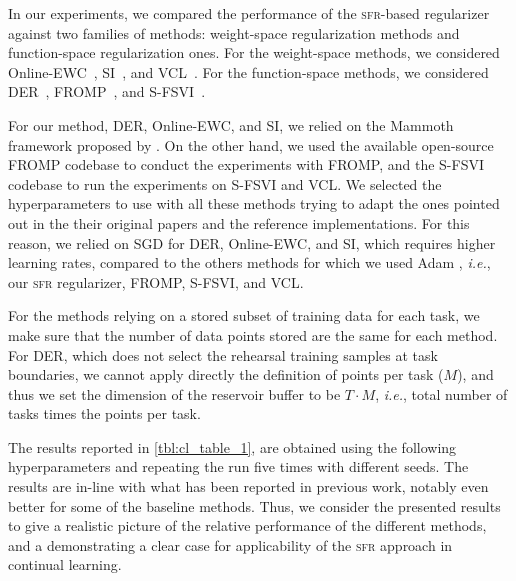 \documentclass{article}
\makeatletter
\newcommand{\ie}{\textit{i.e.\@}\xspace}
\newcommand{\our}{\textsc{sfr}\xspace}
\makeatother
\begin{document}
In our experiments, we compared the performance of the \our-based regularizer against two families of methods: weight-space regularization methods and function-space regularization ones.
For the weight-space methods, we considered Online-EWC~\citep{schwarz2018progress}, SI~\citep{zenke2017continual}, and VCL~\citep{nguyen2018variational}.  %
For the function-space methods, we considered DER~\citep{buzzega2020dark}, FROMP~\citep{pan2020continual}, and S-FSVI~\citep{rudner2022continual}.

For our method, DER, Online-EWC, and SI, we relied on the Mammoth framework proposed by \citep{buzzega2020dark}. On the other hand, we used the available open-source FROMP codebase to conduct the experiments with FROMP, and the S-FSVI codebase to run the experiments on S-FSVI and VCL. We selected the hyperparameters to use with all these methods trying to adapt the ones pointed out in the their original papers and the reference implementations. For this reason, we relied on SGD for DER, Online-EWC, and SI, which requires higher learning rates, compared to the others methods for which we used Adam \cite{adam}, \ie, our \our regularizer, FROMP, S-FSVI, and VCL.

For the methods relying on a stored subset of training data for each task, we make sure that the number of data points stored are the same for each method. For DER, which does not select the rehearsal training samples at task boundaries, we cannot apply directly the definition of points per task ($M$), and thus we set the dimension of the reservoir buffer to be $T \cdot M$, \ie, total number of tasks times the points per task.

The results reported in \cref{tbl:cl_table_1}, are obtained using the following hyperparameters and repeating the run five times with different seeds. The results are in-line with what has been reported in previous work, notably even better for some of the baseline methods. Thus, we consider the presented results to give a realistic picture of the relative performance of the different methods, and a demonstrating a clear case for applicability of the \our approach in continual learning.
 
\end{document}
